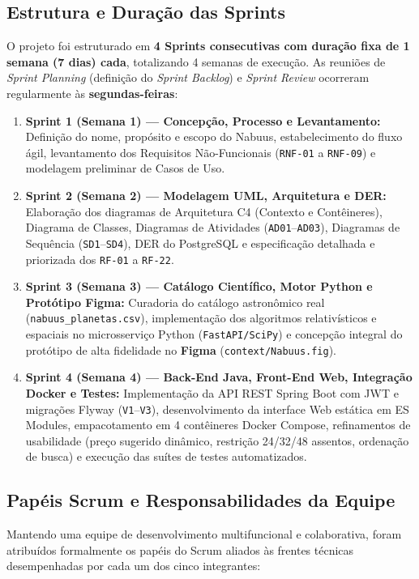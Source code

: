 \documentclass[12pt, a4paper]{article}
\begin{document}
\subsection{Estrutura e Duração das Sprints}
O projeto foi estruturado em \textbf{4 Sprints consecutivas com duração fixa de 1 semana (7 dias) cada}, totalizando 4 semanas de execução. As reuniões de \textit{Sprint Planning} (definição do \textit{Sprint Backlog}) e \textit{Sprint Review} ocorreram regularmente às \textbf{segundas-feiras}:
\begin{enumerate}
    \item \textbf{Sprint 1 (Semana 1) --- Concepção, Processo e Levantamento:} Definição do nome, propósito e escopo do Nabuus, estabelecimento do fluxo ágil, levantamento dos Requisitos Não-Funcionais (\texttt{RNF-01} a \texttt{RNF-09}) e modelagem preliminar de Casos de Uso.
    \item \textbf{Sprint 2 (Semana 2) --- Modelagem UML, Arquitetura e DER:} Elaboração dos diagramas de Arquitetura C4 (Contexto e Contêineres), Diagrama de Classes, Diagramas de Atividades (\texttt{AD01}--\texttt{AD03}), Diagramas de Sequência (\texttt{SD1}--\texttt{SD4}), DER do PostgreSQL e especificação detalhada e priorizada dos \texttt{RF-01} a \texttt{RF-22}.
    \item \textbf{Sprint 3 (Semana 3) --- Catálogo Científico, Motor Python e Protótipo Figma:} Curadoria do catálogo astronômico real (\texttt{nabuus\_planetas.csv}), implementação dos algoritmos relativísticos e espaciais no microsserviço Python (\texttt{FastAPI/SciPy}) e concepção integral do protótipo de alta fidelidade no \textbf{Figma} (\texttt{context/Nabuus.fig}).
    \item \textbf{Sprint 4 (Semana 4) --- Back-End Java, Front-End Web, Integração Docker e Testes:} Implementação da API REST Spring Boot com JWT e migrações Flyway (\texttt{V1}--\texttt{V3}), desenvolvimento da interface Web estática em ES Modules, empacotamento em 4 contêineres Docker Compose, refinamentos de usabilidade (preço sugerido dinâmico, restrição 24/32/48 assentos, ordenação de busca) e execução das suítes de testes automatizados.
\end{enumerate}

\subsection{Papéis Scrum e Responsabilidades da Equipe}
Mantendo uma equipe de desenvolvimento multifuncional e colaborativa, foram atribuídos formalmente os papéis do Scrum aliados às frentes técnicas desempenhadas por cada um dos cinco integrantes:
\end{document}
